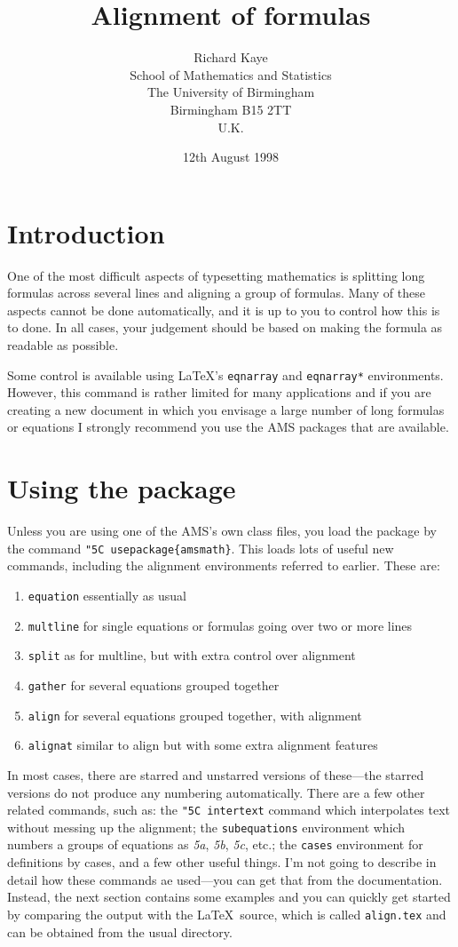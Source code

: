 \documentclass[a4paper]{article}
\title{Alignment of formulas}
\author{Richard Kaye\\School of Mathematics and Statistics\\
The University of Birmingham\\Birmingham B15 2TT\\U.K.}%
\date{12th August 1998}
\newcommand{\fn}[1]{{\tt #1}}
\newcommand{\cn}[1]{{\tt \char"5C #1}}
\begin{document}
\maketitle

\section{Introduction}

One of the most difficult aspects of typesetting mathematics
is splitting long formulas across several lines and aligning a 
group of formulas.  Many of these aspects cannot be done
automatically, and it is up to you to control how this is to done.
In all cases, your judgement should be based on making the formula
as readable as possible.

Some control is available using \LaTeX's \fn{eqnarray} and \fn{eqnarray*}
environments.  However, this command is rather limited for many 
applications and if you are creating a new document in which you 
envisage a large number of long formulas or equations I strongly
recommend you use the AMS packages that are available.

\section{Using the package}

Unless you are using one of the AMS's own class files, you load the package
by the command \cn{usepackage\{amsmath\}}.  This loads lots of useful new
commands, including the alignment environments referred to earlier.
These are:
\begin{enumerate}
\item \fn{equation} essentially as usual
\item \fn{multline} for single equations or formulas going over two 
or more lines
\item \fn{split} as for multline, but with extra control over alignment
\item \fn{gather} for several equations grouped together
\item \fn{align} for several equations grouped together, with alignment
\item \fn{alignat} similar to align but with some extra alignment features
\end{enumerate}

In most cases, there are starred and unstarred versions of these---the
starred versions do not produce any numbering automatically.  There are
a few other related commands, such as: the \cn{intertext} command
which interpolates text without messing up the alignment; the
\fn{subequations} environment which numbers a groups of equations as 
\textit{5a}, \textit{5b}, \textit{5c}, etc.; the \fn{cases} environment
for definitions by cases, and a few other useful things.  I'm not going
to describe in detail how these commands ae used---you can get
that from the documentation.  Instead, the next section contains some 
examples and you can quickly get started by comparing the output with
the \LaTeX\ source, which is called \fn{align.tex} and can be obtained
from the usual directory.
\end{document}
